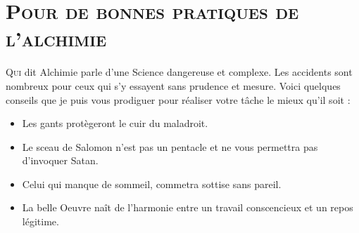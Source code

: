 \section{\textsc{Pour de bonnes pratiques de l'alchimie}}

\lettrine{Q}{ui} dit Alchimie parle d'une Science dangereuse et complexe. Les
accidents sont nombreux pour ceux qui s'y essayent sans prudence et mesure.
Voici quelques conseils que je puis vous prodiguer pour réaliser votre tâche le
mieux qu'il soit :

\begin{itemize}
    \item Les gants protègeront le cuir du maladroit.
    \item Le sceau de Salomon n'est pas un pentacle et ne vous permettra pas
        d'invoquer Satan.
    \item Celui qui manque de sommeil, commetra sottise sans pareil.
    \item La belle Oeuvre naît de l'harmonie entre un travail conscencieux et
        un repos légitime.
\end{itemize}
